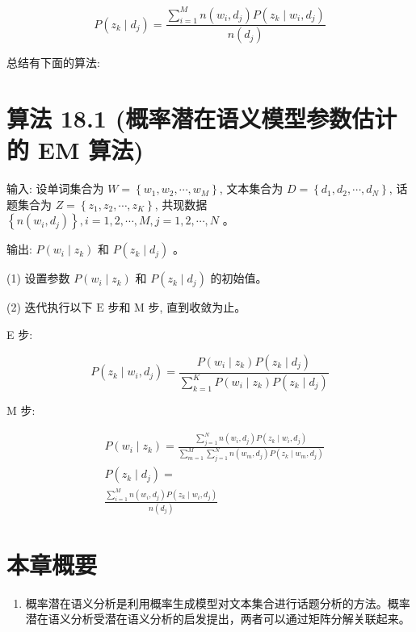 \documentclass[10pt]{article}
\begin{document}
\begin{equation*}
P\left(z_{k} \mid d_{j}\right)=\frac{\sum_{i=1}^{M} n\left(w_{i}, d_{j}\right) P\left(z_{k} \mid w_{i}, d_{j}\right)}{n\left(d_{j}\right)} \tag{18.13}
\end{equation*}


总结有下面的算法:

\section*{算法 18.1 (概率潜在语义模型参数估计的 EM 算法)}
输入: 设单词集合为 $W=\left\{w_{1}, w_{2}, \cdots, w_{M}\right\}$, 文本集合为 $D=\left\{d_{1}, d_{2}, \cdots, d_{N}\right\}$, 话题集合为 $Z=\left\{z_{1}, z_{2}, \cdots, z_{K}\right\}$, 共现数据 $\left\{n\left(w_{i}, d_{j}\right)\right\}, i=1,2, \cdots, M, j=1,2, \cdots, N$ 。

输出: $P\left(w_{i} \mid z_{k}\right)$ 和 $P\left(z_{k} \mid d_{j}\right)$ 。

(1) 设置参数 $P\left(w_{i} \mid z_{k}\right)$ 和 $P\left(z_{k} \mid d_{j}\right)$ 的初始值。

(2) 迭代执行以下 $\mathrm{E}$ 步和 $\mathrm{M}$ 步, 直到收敛为止。

E 步:

$$
P\left(z_{k} \mid w_{i}, d_{j}\right)=\frac{P\left(w_{i} \mid z_{k}\right) P\left(z_{k} \mid d_{j}\right)}{\sum_{k=1}^{K} P\left(w_{i} \mid z_{k}\right) P\left(z_{k} \mid d_{j}\right)}
$$

M 步:

$$
\begin{aligned}
& P\left(w_{i} \mid z_{k}\right)=\frac{\sum_{j=1}^{N} n\left(w_{i}, d_{j}\right) P\left(z_{k} \mid w_{i}, d_{j}\right)}{\sum_{m=1}^{M} \sum_{j=1}^{N} n\left(w_{m}, d_{j}\right) P\left(z_{k} \mid w_{m}, d_{j}\right)} \\
& P\left(z_{k} \mid d_{j}\right)= \\
& \frac{\sum_{i=1}^{M} n\left(w_{i}, d_{j}\right) P\left(z_{k} \mid w_{i}, d_{j}\right)}{n\left(d_{j}\right)}
\end{aligned}
$$

\section*{本章概要}
\begin{enumerate}
  \item 概率潜在语义分析是利用概率生成模型对文本集合进行话题分析的方法。概率潜在语义分析受潜在语义分析的启发提出，两者可以通过矩阵分解关联起来。
\end{enumerate}
\end{document}
